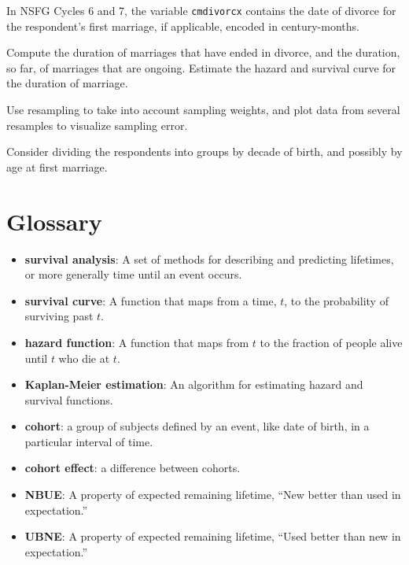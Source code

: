 \documentclass[12pt]{book}
\begin{document}
\begin{exercise}
In NSFG Cycles 6 and 7, the variable \verb"cmdivorcx" contains the
date of divorce for the respondent's first marriage, if applicable,
encoded in century-months.

Compute the duration of marriages that have ended in divorce, and
the duration, so far, of marriages that are ongoing.  Estimate the
hazard and survival curve for the duration of marriage.

Use resampling to take into account sampling weights, and plot
data from several resamples to visualize sampling error.

Consider dividing the respondents into groups by decade of birth,
and possibly by age at first marriage.

\end{exercise}


\section{Glossary}

\begin{itemize}

\item {\bf survival analysis}: A set of methods for describing and
  predicting lifetimes, or more generally time until an event occurs.

\item {\bf survival curve}: A function that maps from a time, $t$, to the
  probability of surviving past $t$.

\item {\bf hazard function}: A function that maps from $t$ to the fraction
of people alive until $t$ who die at $t$.

\item {\bf Kaplan-Meier estimation}: An algorithm for estimating hazard and
survival functions.

\item {\bf cohort}: a group of subjects defined by an event, like date of
birth, in a particular interval of time.

\item {\bf cohort effect}: a difference between cohorts.

\item {\bf NBUE}: A property of expected remaining lifetime, ``New
better than used in expectation.''

\item {\bf UBNE}: A property of expected remaining lifetime, ``Used
better than new in expectation.''

\end{itemize}
\end{document}
